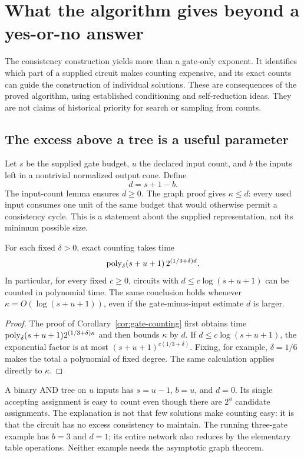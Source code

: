 \section{What the algorithm gives beyond a yes-or-no answer}
\label{sec:algorithm-consequences}

The consistency construction yields more than a gate-only exponent.
It identifies which part of a supplied circuit makes counting expensive,
and its exact counts can guide the construction of individual solutions.
These are consequences of the proved algorithm, using established
conditioning and self-reduction ideas. They are not claims of historical
priority for search or sampling from counts.

\subsection{The excess above a tree is a useful parameter}

Let $s$ be the supplied gate budget, $u$ the declared input count, and
$b$ the inputs left in a nontrivial normalized output cone. Define
\[
 d=s+1-b.
\]
The input-count lemma ensures $d\ge0$. The graph proof gives
$\kappa\le d$: every used input consumes one unit of the same budget
that would otherwise permit a consistency cycle. This is a statement
about the supplied representation, not its minimum possible size.

\begin{corollary}
\label{cor:low-excess}
For each fixed $\delta>0$, exact counting takes time
\[
 \operatorname{poly}_\delta(s+u+1)\,2^{(1/3+\delta)d}.
\]
In particular, for every fixed $c\ge0$, circuits with
$d\le c\log(s+u+1)$ can be counted in polynomial time. The same
conclusion holds whenever $\kappa=O(\log(s+u+1))$, even if the
gate-minus-input estimate $d$ is larger.
\end{corollary}
\begin{proof}
The proof of Corollary~\ref{cor:gate-counting} first obtains time
$\operatorname{poly}_\delta(s+u+1)2^{(1/3+\delta)\kappa}$ and then bounds
$\kappa$ by $d$. If $d\le c\log(s+u+1)$, the exponential factor
is at most $(s+u+1)^{c(1/3+\delta)}$. Fixing, for example,
$\delta=1/6$ makes the total a polynomial of fixed degree.
The same calculation applies directly to $\kappa$.
\end{proof}

A binary AND tree on $u$ inputs has $s=u-1$, $b=u$, and $d=0$.
Its single accepting assignment is easy to count even though there
are $2^u$ candidate assignments. The explanation is not that few
solutions make counting easy: it is that the circuit has no excess
consistency to maintain. The running three-gate example has $b=3$
and $d=1$; its entire network also reduces by the elementary table
operations. Neither example needs the asymptotic graph theorem.

